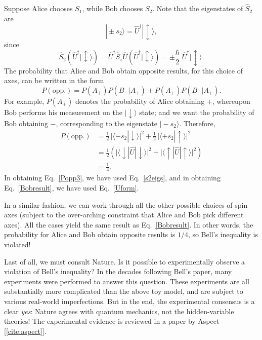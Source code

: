 \documentclass[prx,12pt]{revtex4-2}
\begin{document}
Suppose Alice chooses $S_1$, while Bob chooses $S_2$.  Note that the
eigenstates of $\hat{S}_2$ are
\begin{equation}
  |\!\pm \!s_2\rangle = \hat{U}^\dagger |\!\updownarrow\rangle,
  \label{s2eigs}
\end{equation}
since
\begin{equation}
  \hat{S}_2 \left(\hat{U}^\dagger |\!\updownarrow\rangle\right)
  =
  \hat{U}^\dagger \hat{S}_z \hat{U} \left(\hat{U}^\dagger |\!\updownarrow\rangle\right)
  = \pm \frac{\hbar}{2} \; \hat{U}^\dagger |\!\updownarrow\rangle.
\end{equation}
The probability that Alice and Bob obtain opposite results, for this
choice of axes, can be written in the form
\begin{equation}
  P(\textrm{opp}.) = P(A_+) P(B_-|A_+) +  P(A_+) P(B_-|A_+).
\end{equation}
For example, $P(A_+)$ denotes the probability of Alice obtaining $+$,
whereupon Bob performs his measurement on the $|\!\downarrow\rangle$
state; and we want the probability of Bob obtaining $-$, corresponding
to the eigenstate $|\!-s_2\rangle$.  Therefore,
\begin{align}
  P(\textrm{opp}.) &= \frac{1}{2} \, \big|\langle -s_2 | \!\downarrow\rangle\big|^2
  + \frac{1}{2} \, \big|\langle +s_2 | \!\uparrow\rangle\big|^2 \\
  &= \frac{1}{2} \left(
    \big|\langle \downarrow\! | \hat{U} | \!\downarrow\rangle\big|^2
    + \big|\langle \uparrow \!| \hat{U} | \!\uparrow\rangle\big|^2
    \right) \label{Popp3}\\
    &= \frac{1}{4}. \label{Bobresult}
\end{align}
In obtaining Eq.~\eqref{Popp3}, we have used Eq.~\eqref{s2eigs}, and
in obtaining Eq.~\eqref{Bobresult}, we have used Eq.~\eqref{Uform}.

In a similar fashion, we can work through all the other possible
choices of spin axes (subject to the over-arching constraint that
Alice and Bob pick different axes).  All the cases yield the same
result as Eq.~\eqref{Bobresult}.  In other words, the probability for
Alice and Bob obtain opposite results is $1/4$, so Bell's inequality
is violated!

Last of all, we must consult Nature.  Is it possible to experimentally
observe a violation of Bell's inequality?  In the decades following
Bell's paper, many experiments were performed to answer this question.
These experiments are all substantially more complicated than the
above toy model, and are subject to various real-world imperfections.
But in the end, the experimental consensus is a clear \textit{yes}:
Nature agrees with quantum mechanics, not the hidden-variable
theories!  The experimental evidence is reviewed in a paper by Aspect
[\ref{cite:aspect}].
\end{document}
